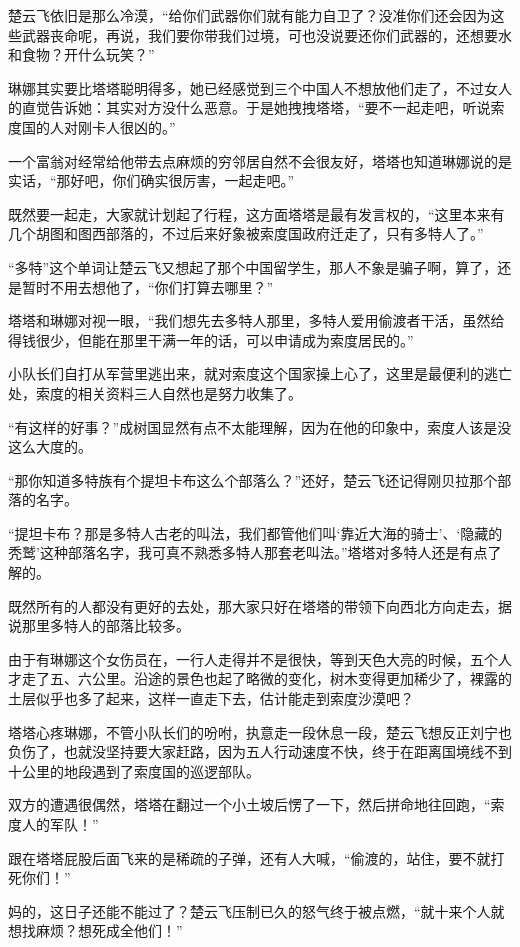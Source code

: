楚云飞依旧是那么冷漠，“给你们武器你们就有能力自卫了？没准你们还会因为这些武器丧命呢，再说，我们要你带我们过境，可也没说要还你们武器的，还想要水和食物？开什么玩笑？”

琳娜其实要比塔塔聪明得多，她已经感觉到三个中国人不想放他们走了，不过女人的直觉告诉她：其实对方没什么恶意。于是她拽拽塔塔，“要不一起走吧，听说索度国的人对刚卡人很凶的。”

一个富翁对经常给他带去点麻烦的穷邻居自然不会很友好，塔塔也知道琳娜说的是实话，“那好吧，你们确实很厉害，一起走吧。”

既然要一起走，大家就计划起了行程，这方面塔塔是最有发言权的，“这里本来有几个胡图和图西部落的，不过后来好象被索度国政府迁走了，只有多特人了。”

“多特”这个单词让楚云飞又想起了那个中国留学生，那人不象是骗子啊，算了，还是暂时不用去想他了，“你们打算去哪里？”

塔塔和琳娜对视一眼，“我们想先去多特人那里，多特人爱用偷渡者干活，虽然给得钱很少，但能在那里干满一年的话，可以申请成为索度居民的。”

小队长们自打从军营里逃出来，就对索度这个国家操上心了，这里是最便利的逃亡处，索度的相关资料三人自然也是努力收集了。

“有这样的好事？”成树国显然有点不太能理解，因为在他的印象中，索度人该是没这么大度的。

“那你知道多特族有个提坦卡布这么个部落么？”还好，楚云飞还记得刚贝拉那个部落的名字。

“提坦卡布？那是多特人古老的叫法，我们都管他们叫‘靠近大海的骑士’、‘隐藏的秃鹫’这种部落名字，我可真不熟悉多特人那套老叫法。”塔塔对多特人还是有点了解的。

既然所有的人都没有更好的去处，那大家只好在塔塔的带领下向西北方向走去，据说那里多特人的部落比较多。

由于有琳娜这个女伤员在，一行人走得并不是很快，等到天色大亮的时候，五个人才走了五、六公里。沿途的景色也起了略微的变化，树木变得更加稀少了，裸露的土层似乎也多了起来，这样一直走下去，估计能走到索度沙漠吧？

塔塔心疼琳娜，不管小队长们的吩咐，执意走一段休息一段，楚云飞想反正刘宁也负伤了，也就没坚持要大家赶路，因为五人行动速度不快，终于在距离国境线不到十公里的地段遇到了索度国的巡逻部队。

双方的遭遇很偶然，塔塔在翻过一个小土坡后愣了一下，然后拼命地往回跑，“索度人的军队！”

跟在塔塔屁股后面飞来的是稀疏的子弹，还有人大喊，“偷渡的，站住，要不就打死你们！”

妈的，这日子还能不能过了？楚云飞压制已久的怒气终于被点燃，“就十来个人就想找麻烦？想死成全他们！”

